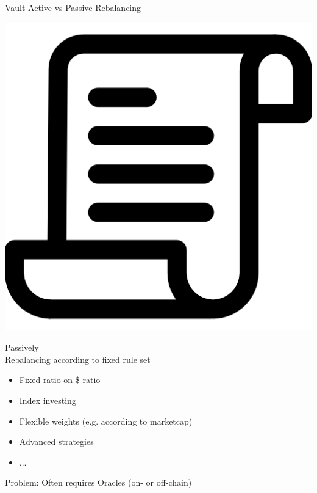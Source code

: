 \documentclass[handout]{beamer}
\begin{document}
\begin{frame}{Vault Active vs Passive Rebalancing}
\begin{minipage}{0.4\textwidth}
	\end{minipage}
	\hfill
	\begin{minipage}{0.4\textwidth}
		\begin{center}
			\includegraphics[scale=0.107]{../assets/images/document.png}
		\end{center}
		\begin{center}
		Passively 	\\ \vspace{1em}
		Rebalancing according to fixed rule set \vspace{0.5em}		
			\begin{scriptsize}
				\begin{itemize}
					\item<1-> Fixed ratio on \$ ratio
					\item<2-> Index investing
					\item<3-> Flexible weights (e.g. according to marketcap)
					\item<4->  Advanced strategies
					\item<4->  ...
				\end{itemize}
			\end{scriptsize}
	 	\vspace{0.5em}Problem: Often requires Oracles (on- or off-chain)
		\end{center}
	\end{minipage}

\end{frame}
\end{document}
